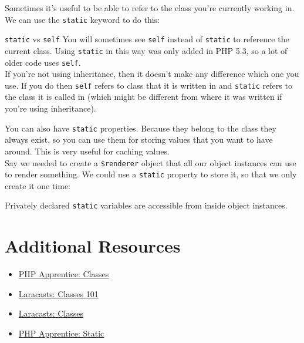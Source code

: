 Sometimes it's useful to be able to refer to the class you're currently working in. We can use the \texttt{static} keyword to do this:


\begin{infobox}{\texttt{static} vs \texttt{self}}
    You will sometimes see \texttt{self} instead of \texttt{static} to reference the current class. Using \texttt{static} in this way was only added in PHP 5.3, so a lot of older code uses \texttt{self}.
    \\

    If you're not using inheritance, then it doesn't make any difference which one you use. If you do then \texttt{self} refers to class that it is written in and \texttt{static} refers to the class it is called in (which might be different from where it was written if you're using inheritance).
\end{infobox}

You can also have \texttt{static} properties. Because they belong to the class they always exist, so you can use them for storing values that you want to have around. This is very useful for caching values.
\\

Say we needed to create a \texttt{\$renderer} object that all our object instances can use to render\textellipsis{} something. We could use a \texttt{static} property to store it, so that we only create it one time:


Privately declared \texttt{static} variables are accessible from inside object instances.



\section{Additional Resources}

\begin{itemize}[leftmargin=*]
    \item \href{https://phpapprentice.com/classes.html}{PHP Apprentice: Classes}
    \item \href{https://laracasts.com/series/php-for-beginners/episodes/12}{Laracasts: Classes 101}
    \item \href{https://laracasts.com/series/object-oriented-bootcamp-in-php/episodes/1}{Laracasts: Classes}
    \item \href{https://phpapprentice.com/static.html}{PHP Apprentice: Static}
\end{itemize}
